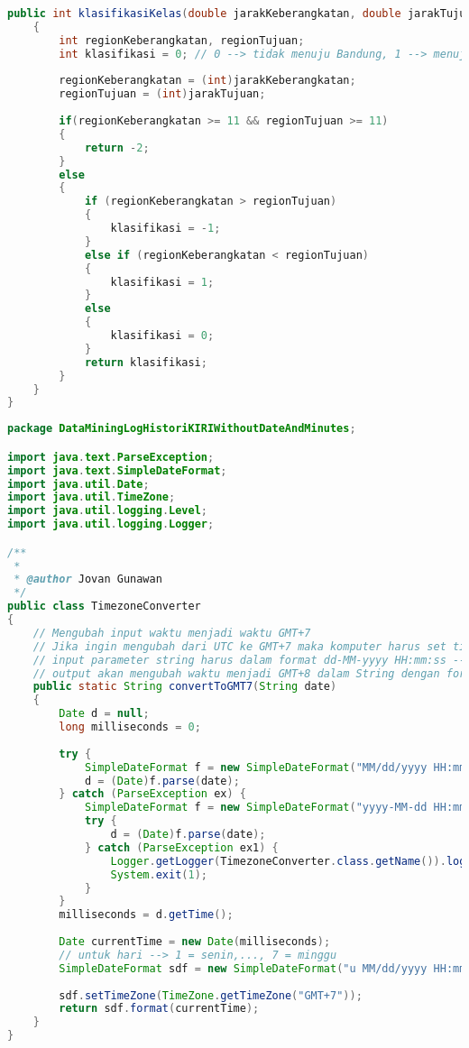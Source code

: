 \begin{lstlisting}[language=Java,basicstyle=\tiny,caption=ProcessingData.java]
    public int klasifikasiKelas(double jarakKeberangkatan, double jarakTujuan)
    {
        int regionKeberangkatan, regionTujuan;
        int klasifikasi = 0; // 0 --> tidak menuju Bandung, 1 --> menuju Bandung, 2 --> menuju region yang sama
        
        regionKeberangkatan = (int)jarakKeberangkatan;
        regionTujuan = (int)jarakTujuan;
        
        if(regionKeberangkatan >= 11 && regionTujuan >= 11)
        {
            return -2;
        }
        else
        {
            if (regionKeberangkatan > regionTujuan)
            {
                klasifikasi = -1;
            }
            else if (regionKeberangkatan < regionTujuan)
            {
                klasifikasi = 1;
            }
            else
            {
                klasifikasi = 0;
            }
            return klasifikasi;
        }
    }
}
\end{lstlisting}

\begin{lstlisting}[language=Java,basicstyle=\tiny,caption=TimezoneConverter.java]
package DataMiningLogHistoriKIRIWithoutDateAndMinutes;

import java.text.ParseException;
import java.text.SimpleDateFormat;
import java.util.Date;
import java.util.TimeZone;
import java.util.logging.Level;
import java.util.logging.Logger;

/**
 *
 * @author Jovan Gunawan
 */
public class TimezoneConverter 
{
    // Mengubah input waktu menjadi waktu GMT+7
    // Jika ingin mengubah dari UTC ke GMT+7 maka komputer harus set timezone ke UTC
    // input parameter string harus dalam format dd-MM-yyyy HH:mm:ss --> contoh 1/1/2014  3:51:15 AM
    // output akan mengubah waktu menjadi GMT+8 dalam String dengan format EEE MM/dd/yyyy HH:mm:ss --> contoh Wed 01/01/2014 03:51:15
    public static String convertToGMT7(String date)
    {
        Date d = null;
        long milliseconds = 0;
        
        try {
            SimpleDateFormat f = new SimpleDateFormat("MM/dd/yyyy HH:mm");
            d = (Date)f.parse(date);
        } catch (ParseException ex) {
            SimpleDateFormat f = new SimpleDateFormat("yyyy-MM-dd HH:mm:ss");
            try {
                d = (Date)f.parse(date);
            } catch (ParseException ex1) {
                Logger.getLogger(TimezoneConverter.class.getName()).log(Level.SEVERE, null, ex);
                System.exit(1);
            }
        }
        milliseconds = d.getTime();
        
        Date currentTime = new Date(milliseconds);
        // untuk hari --> 1 = senin,..., 7 = minggu
        SimpleDateFormat sdf = new SimpleDateFormat("u MM/dd/yyyy HH:mm:ss");
        
        sdf.setTimeZone(TimeZone.getTimeZone("GMT+7"));
        return sdf.format(currentTime);
    }
}
\end{lstlisting}

